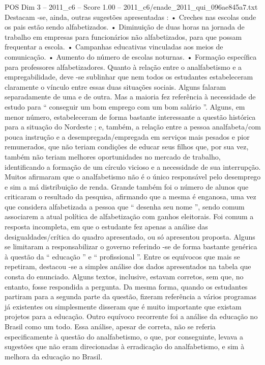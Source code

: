 \begin{textsample}{POS Dim 3 – 2011\_c6 – Score 1.00 – 2011\_c6/enade\_2011\_qui\_096ae845a7.txt}
Destacam -se, ainda, outras sugestões apresentadas : • Creches nas escolas onde os pais estão sendo alfabetizados. • Diminuição de duas horas na jornada de trabalho em empresas para funcionários não alfabetizados, para que possam frequentar a escola. • Campanhas educativas vinculadas aos meios de comunicação. • Aumento do número de escolas noturnas. • Formação específica para professores alfabetizadores.
Quanto à relação entre o analfabetismo e a empregabilidade, deve -se sublinhar que nem todos os estudantes estabeleceram claramente o vínculo entre essas duas situações sociais.
Alguns falaram separadamente de uma e de outra.
Mas a maioria fez referência à necessidade de estudo para “ conseguir um bom emprego com um bom salário ”.
Alguns, em menor número, estabeleceram de forma bastante interessante a questão histórica para a situação do Nordeste ; e, também, a relação entre a pessoa analfabeta/com pouca instrução e a desempregada/empregada em serviços mais pesados e pior remunerados, que não teriam condições de educar seus filhos que, por sua vez, também não teriam melhores oportunidades no mercado de trabalho, identificando a formação de um círculo vicioso e a necessidade de sua interrupção.
Muitos afirmaram que o analfabetismo não é o único responsável pelo desemprego e sim a má distribuição de renda.
Grande também foi o número de alunos que criticaram o resultado da pesquisa, afirmando que a mesma é enganosa, uma vez que considera alfabetizada a pessoa que “ desenha seu nome ”, sendo comum associarem a atual política de alfabetização com ganhos eleitorais.
Foi comum a resposta incompleta, em que o estudante fez apenas a análise das desigualdades/crítica do quadro apresentado, ou só apresentou proposta.
Alguns se limitaram a responsabilizar o governo referindo -se de forma bastante genérica à questão da “ educação ” e “ profissional ”.
Entre os equívocos que mais se repetiram, destacou -se a simples análise dos dados apresentados na tabela que consta do enunciado.
Alguns textos, inclusive, estavam corretos, sem que, no entanto, fosse respondida a pergunta.
Da mesma forma, quando os estudantes partiram para a segunda parte da questão, fizeram referência a vários programas já existentes ou simplesmente disseram que é muito importante que existam projetos para a educação.
Outro equívoco recorrente foi a análise da educação no Brasil como um todo.
Essa análise, apesar de correta, não se referia especificamente à questão do analfabetismo, o que, por conseguinte, levava a sugestões que não eram direcionadas à erradicação do analfabetismo, e sim à melhora da educação no Brasil.

\end{textsample}
